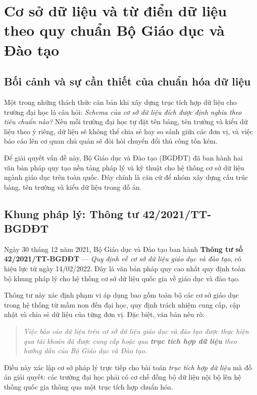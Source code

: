 \newpage
\section{Cơ sở dữ liệu và từ điển dữ liệu theo quy chuẩn Bộ Giáo dục và Đào tạo}

\subsection{Bối cảnh và sự cần thiết của chuẩn hóa dữ liệu}

Một trong những thách thức căn bản khi xây dựng trục tích hợp dữ liệu cho trường đại học là câu hỏi: \textit{Schema của cơ sở dữ liệu đích được định nghĩa theo tiêu chuẩn nào?} Nếu mỗi trường đại học tự đặt tên bảng, tên trường và kiểu dữ liệu theo ý riêng, dữ liệu sẽ không thể chia sẻ hay so sánh giữa các đơn vị, và việc báo cáo lên cơ quan chủ quản sẽ đòi hỏi chuyển đổi thủ công tốn kém.

Để giải quyết vấn đề này, Bộ Giáo dục và Đào tạo (BGDĐT) đã ban hành hai văn bản pháp quy tạo nền tảng pháp lý và kỹ thuật cho hệ thống cơ sở dữ liệu ngành giáo dục trên toàn quốc. Đây chính là căn cứ để nhóm xây dựng cấu trúc bảng, tên trường và kiểu dữ liệu trong đồ án.

\subsection{Khung pháp lý: Thông tư 42/2021/TT-BGDĐT}

Ngày 30 tháng 12 năm 2021, Bộ Giáo dục và Đào tạo ban hành \textbf{Thông tư số 42/2021/TT-BGDĐT} — \textit{Quy định về cơ sở dữ liệu giáo dục và đào tạo}, có hiệu lực từ ngày 14/02/2022. Đây là văn bản pháp quy cao nhất quy định toàn bộ khung pháp lý cho hệ thống cơ sở dữ liệu quốc gia về giáo dục và đào tạo.

Thông tư này xác định phạm vi áp dụng bao gồm toàn bộ các cơ sở giáo dục trong hệ thống từ mầm non đến đại học, quy định trách nhiệm cung cấp, cập nhật và chia sẻ dữ liệu của từng đơn vị. Đặc biệt, văn bản nêu rõ:

\begin{quote}
\textit{Việc báo cáo dữ liệu trên cơ sở dữ liệu giáo dục và đào tạo được thực hiện qua tài khoản đã được cung cấp hoặc qua \textbf{trục tích hợp dữ liệu} theo hướng dẫn của Bộ Giáo dục và Đào tạo.}
\end{quote}

Điều này xác lập cơ sở pháp lý trực tiếp cho bài toán \textit{trục tích hợp dữ liệu} mà đồ án giải quyết: các trường đại học phải có cơ chế đồng bộ dữ liệu nội bộ lên hệ thống quốc gia thông qua một trục tích hợp chuẩn hóa.

